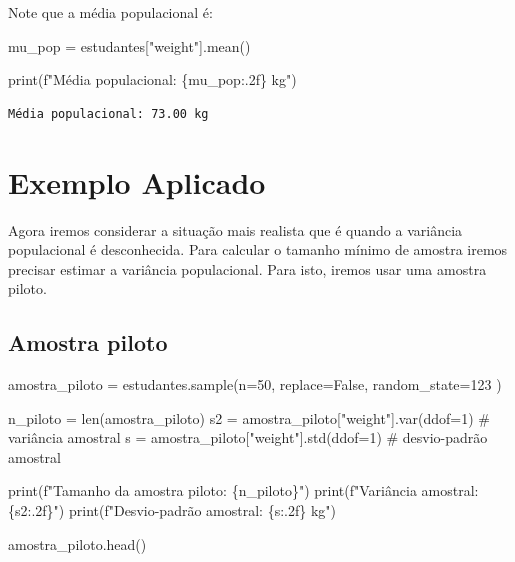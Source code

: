 \documentclass[
  letterpaper,
  DIV=11,
  numbers=noendperiod]{scrreprt}
\newenvironment{Shaded}{\begin{snugshade}}{\end{snugshade}}
\newcommand{\BuiltInTok}[1]{\textcolor[rgb]{0.00,0.23,0.31}{#1}}
\newcommand{\CommentTok}[1]{\textcolor[rgb]{0.37,0.37,0.37}{#1}}
\newcommand{\DecValTok}[1]{\textcolor[rgb]{0.68,0.00,0.00}{#1}}
\newcommand{\NormalTok}[1]{\textcolor[rgb]{0.00,0.23,0.31}{#1}}
\newcommand{\OperatorTok}[1]{\textcolor[rgb]{0.37,0.37,0.37}{#1}}
\newcommand{\SpecialCharTok}[1]{\textcolor[rgb]{0.37,0.37,0.37}{#1}}
\newcommand{\SpecialStringTok}[1]{\textcolor[rgb]{0.13,0.47,0.30}{#1}}
\newcommand{\StringTok}[1]{\textcolor[rgb]{0.13,0.47,0.30}{#1}}
\newcommand{\VariableTok}[1]{\textcolor[rgb]{0.07,0.07,0.07}{#1}}
\begin{document}
Note que a média populacional é:

\begin{Shaded}
\begin{Highlighting}[]
\NormalTok{mu\_pop }\OperatorTok{=}\NormalTok{ estudantes[}\StringTok{"weight"}\NormalTok{].mean()}

\BuiltInTok{print}\NormalTok{(}\SpecialStringTok{f"Média populacional: }\SpecialCharTok{\{}\NormalTok{mu\_pop}\SpecialCharTok{:.2f\}}\SpecialStringTok{ kg"}\NormalTok{)}
\end{Highlighting}
\end{Shaded}

\begin{verbatim}
Média populacional: 73.00 kg
\end{verbatim}

\section{Exemplo Aplicado}\label{exemplo-aplicado-1}

Agora iremos considerar a situação mais realista que é quando a
variância populacional é desconhecida. Para calcular o tamanho mínimo de
amostra iremos precisar estimar a variância populacional. Para isto,
iremos usar uma amostra piloto.

\subsection{Amostra piloto}\label{amostra-piloto}

\begin{Shaded}
\begin{Highlighting}[]
\NormalTok{amostra\_piloto }\OperatorTok{=}\NormalTok{ estudantes.sample(n}\OperatorTok{=}\DecValTok{50}\NormalTok{, replace}\OperatorTok{=}\VariableTok{False}\NormalTok{, random\_state}\OperatorTok{=}\DecValTok{123}\NormalTok{ ) }

\NormalTok{n\_piloto }\OperatorTok{=} \BuiltInTok{len}\NormalTok{(amostra\_piloto)}
\NormalTok{s2 }\OperatorTok{=}\NormalTok{ amostra\_piloto[}\StringTok{"weight"}\NormalTok{].var(ddof}\OperatorTok{=}\DecValTok{1}\NormalTok{) }\CommentTok{\# variância amostral }
\NormalTok{s }\OperatorTok{=}\NormalTok{ amostra\_piloto[}\StringTok{"weight"}\NormalTok{].std(ddof}\OperatorTok{=}\DecValTok{1}\NormalTok{) }\CommentTok{\# desvio{-}padrão amostral}

\BuiltInTok{print}\NormalTok{(}\SpecialStringTok{f"Tamanho da amostra piloto: }\SpecialCharTok{\{}\NormalTok{n\_piloto}\SpecialCharTok{\}}\SpecialStringTok{"}\NormalTok{) }
\BuiltInTok{print}\NormalTok{(}\SpecialStringTok{f"Variância amostral: }\SpecialCharTok{\{}\NormalTok{s2}\SpecialCharTok{:.2f\}}\SpecialStringTok{"}\NormalTok{) }
\BuiltInTok{print}\NormalTok{(}\SpecialStringTok{f"Desvio{-}padrão amostral: }\SpecialCharTok{\{}\NormalTok{s}\SpecialCharTok{:.2f\}}\SpecialStringTok{ kg"}\NormalTok{)}

\NormalTok{amostra\_piloto.head()}
\end{Highlighting}
\end{Shaded}
\end{document}
